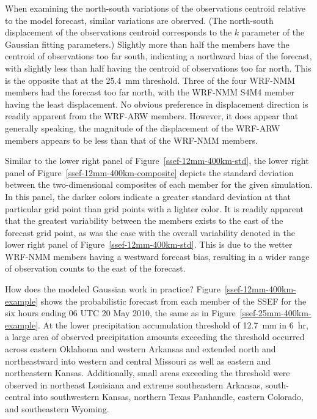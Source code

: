 When examining the north-south variations of the observations centroid relative to the model forecast, similar variations are observed.
(The north-south displacement of the observations centroid corresponds to the $k$ parameter of the Gaussian fitting parameters.)
Slightly more than half the members have the centroid of observations too far south, indicating a northward bias of the forecast, with slightly less than half having the centroid of observations too far north.
This is the opposite that at the \mbox{25.4 mm} threshold.
Three of the four WRF-NMM members had the forecast too far north, with the WRF-NMM S4M4 member having the least displacement.
No obvious preference in displacement direction is readily apparent from the WRF-ARW members.
However, it does appear that generally speaking, the magnitude of the displacement of the WRF-ARW members appears to be less than that of the WRF-NMM members.


Similar to the lower right panel of \mbox{Figure \ref{ssef-12mm-400km-std}}, the lower right panel of \mbox{Figure \ref{ssef-12mm-400km-composite}} depicts the standard deviation between the two-dimensional composites of each member for the given simulation.
In this panel, the darker colors indicate a greater standard deviation at that particular grid point than grid points with a lighter color.
It is readily apparent that the greatest variability between the members exists to the east of the forecast grid point, as was the case with the overall variability denoted in the lower right panel of \mbox{Figure \ref{ssef-12mm-400km-std}}.
This is due to the wetter WRF-NMM members having a westward forecast bias, resulting in a wider range of observation counts to the east of the forecast.


How does the modeled Gaussian work in practice?
\mbox{Figure \ref{ssef-12mm-400km-example}} shows the probabilistic forecast from each member of the SSEF for the six hours ending 06 UTC 20 May 2010, the same as in \mbox{Figure \ref{ssef-25mm-400km-example}}.
At the lower precipitation accumulation threshold of \mbox{12.7 mm} in \mbox{6 hr}, a large area of observed precipitation amounts exceeding the threshold occurred across eastern Oklahoma and western Arkansas and extended north and northeastward into western and central Missouri as well as eastern and northeastern Kansas.
Additionally, small areas exceeding the threshold were observed in northeast Louisiana and extreme southeastern Arkansas, south-central into southwestern Kansas, northern Texas Panhandle, eastern Colorado, and southeastern Wyoming.


